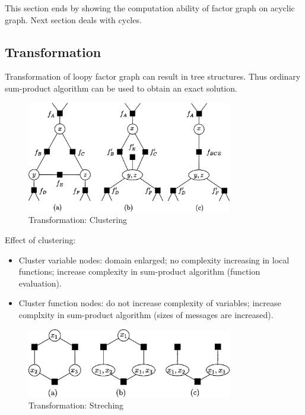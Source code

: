This section ends by showing the computation ability of factor graph
on acyclic graph. Next section deals with cycles. 


\subsection{Transformation}

Transformation of loopy factor graph can result in 
tree structures. Thus ordinary sum-product algorithm 
can be used to obtain an exact solution. 

\begin{figure}[htb]
\centering
	\includegraphics[width=0.8\textwidth]{fig/kschischang2001-clutering.png}
	\caption{Transformation: Clustering\cite{kschischang2001factor}}
\end{figure}	

Effect of clustering:
\begin{itemize}
	\item Cluster variable nodes: domain enlarged; no complexity increasing
	in local functions; increase complexity in sum-product algorithm
	(function evaluation). 
	\item Cluster function nodes: do not increase complexity of variables;
	increase complxity in sum-product algorithm
	(sizes of messages are increased). 
\end{itemize}

\begin{figure}[htb]
\centering
	\includegraphics[width=0.8\textwidth]{fig/kschischang2001-streching.png}
	\caption{Transformation: Streching\cite{kschischang2001factor}}
\end{figure}

